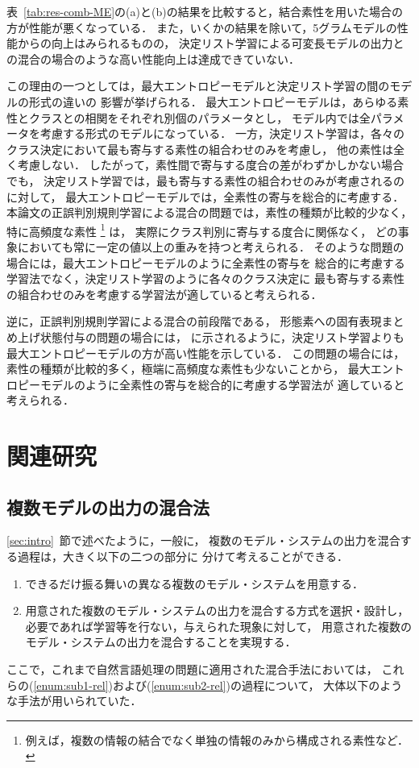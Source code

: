 表~\ref{tab:res-comb-ME}の(a)と(b)の結果を比較すると，結合素性を用いた場合の方が性能が悪くなっている．
また，いくかの結果を除いて，5グラムモデルの性能からの向上はみられるものの，
決定リスト学習による可変長モデルの出力との混合の場合のような高い性能向上は達成できていない．

この理由の一つとしては，最大エントロピーモデルと決定リスト学習の間のモデルの形式の違いの
影響が挙げられる．
最大エントロピーモデルは，あらゆる素性とクラスとの相関をそれぞれ別個のパラメータとし，
モデル内では全パラメータを考慮する形式のモデルになっている．
一方，決定リスト学習は，各々のクラス決定において最も寄与する素性の組合わせのみを考慮し，
他の素性は全く考慮しない．
したがって，素性間で寄与する度合の差がわずかしかない場合でも，
決定リスト学習では，最も寄与する素性の組合わせのみが考慮されるのに対して，
最大エントロピーモデルでは，全素性の寄与を総合的に考慮する．
本論文の正誤判別規則学習による混合の問題では，素性の種類が比較的少なく，
特に高頻度な素性
\footnote{
  例えば，複数の情報の結合でなく単独の情報のみから構成される素性など．
}
は，
実際にクラス判別に寄与する度合に関係なく，
どの事象においても常に一定の値以上の重みを持つと考えられる．
そのような問題の場合には，最大エントロピーモデルのように全素性の寄与を
総合的に考慮する学習法でなく，決定リスト学習のように各々のクラス決定に
最も寄与する素性の組合わせのみを考慮する学習法が適していると考えられる．

逆に，正誤判別規則学習による混合の前段階である，
形態素への固有表現まとめ上げ状態付与の問題の場合には，
\cite{Sassano00bjx,Sassano00a}に示されるように，決定リスト学習よりも
最大エントロピーモデルの方が高い性能を示している．
この問題の場合には，素性の種類が比較的多く，極端に高頻度な素性も少ないことから，
最大エントロピーモデルのように全素性の寄与を総合的に考慮する学習法が
適していると考えられる．







\section{関連研究}
\label{sec:rel}

\subsection{複数モデルの出力の混合法}

\ref{sec:intro}~節で述べたように，一般に，
複数のモデル・システムの出力を混合する過程は，大きく以下の二つの部分に
分けて考えることができる．
\begin{enumerate}
\item \label{enum:sub1-rel}
	できるだけ振る舞いの異なる複数のモデル・システムを用意する．
\item \label{enum:sub2-rel}
	用意された複数のモデル・システムの出力を混合する方式を選択・設計し，
	必要であれば学習等を行ない，与えられた現象に対して，
	用意された複数のモデル・システムの出力を混合することを実現する．
\end{enumerate}
ここで，これまで自然言語処理の問題に適用された混合手法においては，
これらの(\ref{enum:sub1-rel})および(\ref{enum:sub2-rel})の過程について，
大体以下のような手法が用いられていた．

